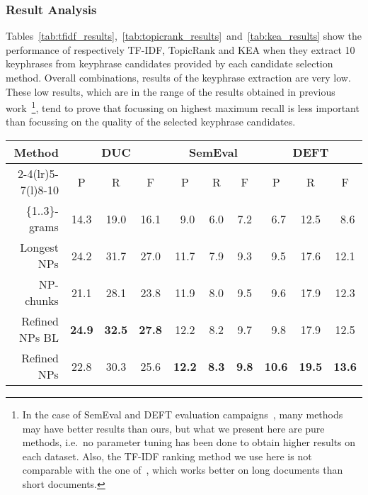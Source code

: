     \subsubsection{Result Analysis}
    \label{subsubsec:candidate_extraction_result_analysis}
      Tables~\ref{tab:tfidf_results},~\ref{tab:topicrank_results}~and~\ref{tab:kea_results}
      show the performance of respectively TF-IDF, TopicRank and KEA when they
      extract 10 keyphrases from keyphrase candidates provided by each candidate
      selection method. Overall combinations, results of the keyphrase
      extraction are very low. These low results, which are in the range of the
      results obtained in previous
      work~\cite{hassan2010conundrums,kim2010semeval,paroubek2012deft}\footnote{In
      the case of SemEval and DEFT evaluation
      campaigns~\cite{kim2010semeval,paroubek2012deft}, many methods may have
      better results than ours, but what we present here are pure methods,
      i.e.~no parameter tuning has been done to obtain higher results on each
      dataset. Also, the TF-IDF ranking method we use here is not comparable
      with the one of~, which works better on long
      documents than short documents.}, tend to prove that focussing on highest
      maximum recall is less important than focussing on the quality of the
      selected keyphrase candidates.
      \begin{table*}
        \centering
        \begin{tabular}{@{}rccccccccc@{}}
          \toprule
          \multirow{2}{*}[-2pt]{\textbf{Method}} & \multicolumn{3}{c}{\textbf{DUC}} & \multicolumn{3}{c}{\textbf{SemEval}} & \multicolumn{3}{c}{\textbf{DEFT}}\\
          \cmidrule(r){2-4}\cmidrule(lr){5-7}\cmidrule(l){8-10}
          & P & R & F & P & R & F & P & R & F\\
          \midrule
          \{1..3\}-grams & 14.3 & 19.0 & 16.1 & $~~$9.0 & $~~$6.0 & $~~$7.2 & $~~$6.7 & 12.5 & $~~$8.6\\
          Longest NPs & 24.2 & 31.7 & 27.0 & 11.7 & $~~$7.9 & $~~$9.3 & $~~$9.5 & 17.6 & 12.1\\
          NP-chunks & 21.1 & 28.1 & 23.8 & 11.9 & $~~$8.0 & $~~$9.5 & $~~$9.6 & 17.9 & 12.3\\
          Refined NPs BL & \textbf{24.9} & \textbf{32.5} & \textbf{27.8} & 12.2 & $~~$8.2 & $~~$9.7 & $~~$9.8 & 17.9 & 12.5\\
          Refined NPs & 22.8 & 30.3 & 25.6 & \textbf{12.2} & \textbf{$~~$8.3} & \textbf{$~~$9.8} & \textbf{10.6} & \textbf{19.5} & \textbf{13.6}\\
          \bottomrule
        \end{tabular}
        \caption{Comparison of candidate selection methods, when 10 keyphrases
                 are extracted by \textbf{TF-IDF}.
                 \label{tab:tfidf_results}}
      \end{table*}

